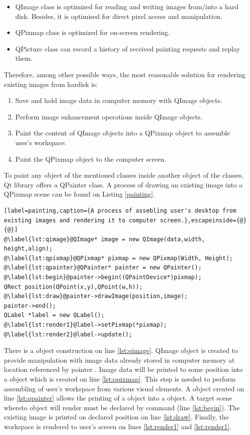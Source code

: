 \begin{itemize}
\item QImage class is optimized for reading and writing images from/into a hard disk. Besides, it is optimised for direct pixel access and manipulation.
\item QPixmap class is optimized for on-screen rendering.
\item QPicture class can record a history of received painting requests and replay them.
\end{itemize}

Therefore, among other possible ways, the most reasonable solution for rendering existing images from hardisk is:

\begin{enumerate}
  \item Save and hold image data in computer memory with QImage objects.
  \item Perform image enhancement operations inside QImage objects.
  \item Paint the content of QImage objects into a QPixmap object to assemble user's workspace.
  \item Paint the QPixmap object to the computer screen.
\end{enumerate}

To paint any object of the mentioned classes inside another object of the classes, Qt library offers a QPainter class. A process of drawing an existing image into a QPixmap scene can be found on Listing \ref{painting}.

\begin{lstlisting}[label=painting,caption={A process of assebling user's desktop from existing images and rendering it to computer screen.},escapeinside={@}{@}]
@\label{lst:qimage}@QImage* image = new QImage(data,width, height,align);
@\label{lst:qpixmap}@QPixmap* pixmap = new QPixmap(Width, Height);
@\label{lst:qpainter}@QPainter* painter = new QPainter();
@\label{lst:begin}@painter->begin((QPaintDevice*)pixmap);
QRect position(QPoint(x,y),QPoint(w,h));
@\label{lst:draw}@painter->drawImage(position,image);
painter->end();
QLabel *label = new QLabel();
@\label{lst:render1}@label->setPixmap(*pixmap);
@\label{lst:render2}@label->update();
\end{lstlisting}

There is a  object construction on line \ref{lst:qimage}. QImage object is created to provide manipulation with image data already stored in computer memory at location referenced by pointer . Image data will be printed to some position into a  object which is created on line \ref{lst:qpixmap}. This step is needed to perform assembling of user's workspace from various visual elements. A  object created on line \ref{lst:qpainter} allows the printing of a  object into a  object. A target scene whereto  object will render must be declared by  command (line \ref{lst:begin}). The existing image is printed on declared position on line \ref{lst:draw}. Finally, the workspace is rendered to user's screen on lines \ref{lst:render1} and \ref{lst:render1}.



